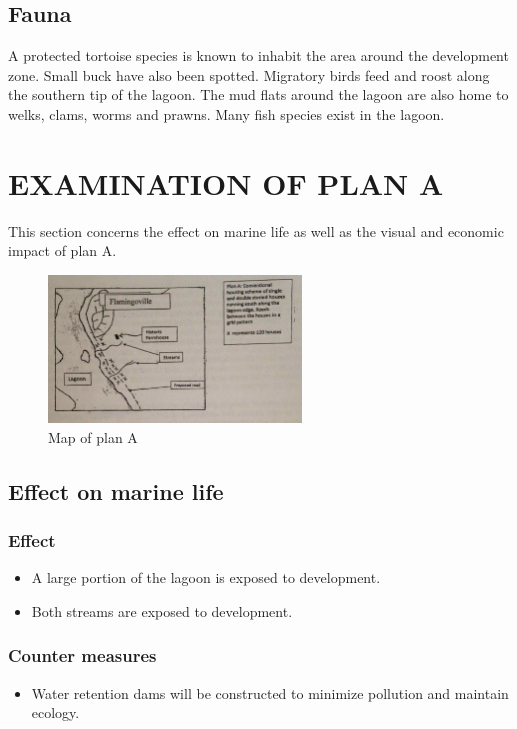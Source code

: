 \documentclass{article}
\begin{document}
\subsection{Fauna}
A protected tortoise species is known to inhabit the area around the development zone. Small buck have also been spotted. Migratory birds feed and roost along the southern tip of the lagoon. The mud flats around the lagoon are also home to welks, clams, worms and prawns. Many fish species exist in the lagoon.

\newpage
\section{EXAMINATION OF PLAN A}
This section concerns the effect on marine life as well as the visual and economic impact of plan A.

\begin{figure}[h!]
	\centering
	\includegraphics[width=0.6\textwidth]{plan_a}
	\caption{Map of plan A}
\end{figure}

\subsection{Effect on marine life}
\subsubsection{Effect}
\begin{itemize}
	\item A large portion of the lagoon is exposed to development.
	\item Both streams are exposed to development.
\end{itemize}

\subsubsection{Counter measures}
\begin{itemize}
	\item Water retention dams will be constructed to minimize pollution and maintain ecology.
\end{itemize}
\end{document}
